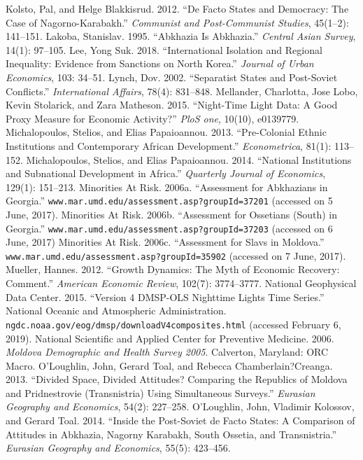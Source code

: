 \documentclass[12pt,a4paper]{article}%
\begin{document}
\begin{thebibliography}{99}
\bibitem{} Kolsto, Pal, and Helge Blakkisrud. 2012. ``De Facto States and Democracy: The Case of Nagorno-Karabakh.'' \textit{Communist and Post-Communist Studies}, 45(1--2): 141--151.
\bibitem{} Lakoba, Stanislav. 1995. ``Abkhazia Is Abkhazia.'' \textit{Central Asian Survey}, 14(1): 97--105.
\bibitem{} Lee, Yong Suk. 2018. ``International Isolation and Regional Inequality: Evidence from Sanctions on North Korea.'' \textit{Journal of Urban Economics}, 103: 34--51.
\bibitem{} Lynch, Dov. 2002. ``Separatist States and Post-Soviet Conflicts.'' \textit{International Affairs}, 78(4): 831--848.
\bibitem{} Mellander, Charlotta, Jose Lobo, Kevin Stolarick, and Zara Matheson. 2015. ``Night-Time Light Data: A Good Proxy Measure for Economic Activity?'' \textit{PloS one}, 10(10), e0139779.
\bibitem{} Michalopoulos, Stelios, and Elias Papaioannou. 2013. ``Pre-Colonial Ethnic Institutions and Contemporary African Development.'' \textit{Econometrica}, 81(1): 113--152.
\bibitem{} Michalopoulos, Stelios, and Elias Papaioannou. 2014. ``National Institutions and Subnational Development in Africa.'' \textit{Quarterly Journal of Economics}, 129(1): 151--213.
\bibitem{} Minorities At Risk. 2006a. ``Assessment for Abkhazians in Georgia.'' \verb!www.mar.umd.edu/assessment.asp?groupId=37201! (accessed on 5 June, 2017).
\bibitem{} Minorities At Risk. 2006b. ``Assessment for Ossetians (South) in Georgia.'' \verb!www.mar.umd.edu/assessment.asp?groupId=37203!  (accessed on 6 June, 2017)
\bibitem{} Minorities At Risk. 2006c. ``Assessment for Slavs in Moldova.'' \verb!www.mar.umd.edu/assessment.asp?groupId=35902! (accessed on 7 June, 2017).
\bibitem{} Mueller, Hannes. 2012. ``Growth Dynamics: The Myth of Economic Recovery: Comment.'' \textit{American Economic Review}, 102(7): 3774--3777.
\bibitem{} National Geophysical Data Center. 2015. ``Version 4 DMSP-OLS Nighttime Lights Time Series.'' National Oceanic and Atmospheric Administration. \verb!ngdc.noaa.gov/eog/dmsp/downloadV4composites.html! (accessed February 6, 2019).
\bibitem{} National Scientific and Applied Center for Preventive Medicine. 2006. \textit{Moldova Demographic and Health Survey 2005}. Calverton, Maryland: ORC Macro.
\bibitem{} O'Loughlin, John, Gerard Toal, and Rebecca Chamberlain?Creanga. 2013. ``Divided Space, Divided Attitudes? Comparing the Republics of Moldova and Pridnestrovie (Transnistria) Using Simultaneous Surveys.'' \textit{Eurasian Geography and Economics}, 54(2): 227--258.
\bibitem{} O'Loughlin, John, Vladimir Kolossov, and Gerard Toal. 2014. ``Inside the Post-Soviet de Facto States: A Comparison of Attitudes in Abkhazia, Nagorny Karabakh, South Ossetia, and Transnistria.'' \textit{Eurasian Geography and Economics}, 55(5): 423--456.

\end{thebibliography}
\end{document}
